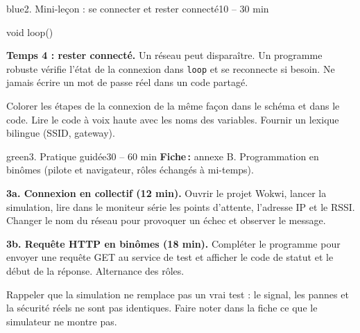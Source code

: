 \documentclass[11pt,a4paper]{article}
\begin{document}
\begin{etape}{blue}{2. Mini-leçon : se connecter et rester connecté}{10 -- 30 min}
\begin{arduino}
void loop() { }
\end{arduino}

\textbf{Temps 4 : rester connecté.} Un réseau peut disparaître. Un programme robuste vérifie l'état de la connexion dans \texttt{loop} et se reconnecte si besoin. Ne jamais écrire un mot de passe réel dans un code partagé.

\begin{astuce}
Colorer les étapes de la connexion de la même façon dans le schéma et dans le code. Lire le code à voix haute avec les noms des variables. Fournir un lexique bilingue (SSID, gateway).
\end{astuce}
\end{etape}

\begin{etape}{green}{3. Pratique guidée}{30 -- 60 min}
\textbf{Fiche\,:} annexe B. Programmation en binômes (pilote et navigateur, rôles échangés à mi-temps).

\textbf{3a. Connexion en collectif (12 min).} Ouvrir le projet Wokwi, lancer la simulation, lire dans le moniteur série les points d'attente, l'adresse IP et le RSSI. Changer le nom du réseau pour provoquer un échec et observer le message.

\textbf{3b. Requête HTTP en binômes (18 min).} Compléter le programme pour envoyer une requête GET au service de test et afficher le code de statut et le début de la réponse. Alternance des rôles.


\begin{astuce}
Rappeler que la simulation ne remplace pas un vrai test : le signal, les pannes et la sécurité réels ne sont pas identiques. Faire noter dans la fiche ce que le simulateur ne montre pas.
\end{astuce}
\end{etape}
\end{document}
